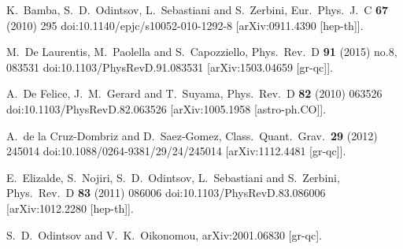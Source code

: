 \documentclass[aps,prd,twocolumn,groupedaddress,showpacs,nofootinbib,amssymb]{revtex4-2}
\begin{document}
\begin{thebibliography}{99}
  K.~Bamba, S.~D.~Odintsov, L.~Sebastiani and S.~Zerbini,
  Eur.\ Phys.\ J.\ C {\bf 67} (2010) 295
  doi:10.1140/epjc/s10052-010-1292-8
  [arXiv:0911.4390 [hep-th]].




  M.~De Laurentis, M.~Paolella and S.~Capozziello,
  Phys.\ Rev.\ D {\bf 91} (2015) no.8,  083531
  doi:10.1103/PhysRevD.91.083531
  [arXiv:1503.04659 [gr-qc]].






  A.~De Felice, J.~M.~Gerard and T.~Suyama,
  Phys.\ Rev.\ D {\bf 82} (2010) 063526
  doi:10.1103/PhysRevD.82.063526
  [arXiv:1005.1958 [astro-ph.CO]].



  A.~de la Cruz-Dombriz and D.~Saez-Gomez,
  Class.\ Quant.\ Grav.\  {\bf 29} (2012) 245014
  doi:10.1088/0264-9381/29/24/245014
  [arXiv:1112.4481 [gr-qc]].


E.~Elizalde, S.~Nojiri, S.~D.~Odintsov, L.~Sebastiani and
S.~Zerbini,
Phys.\ Rev.\ D {\bf 83} (2011) 086006
doi:10.1103/PhysRevD.83.086006 [arXiv:1012.2280 [hep-th]].

  S.~D.~Odintsov and V.~K.~Oikonomou,
  arXiv:2001.06830 [gr-qc].



\end{thebibliography}
\end{document}
